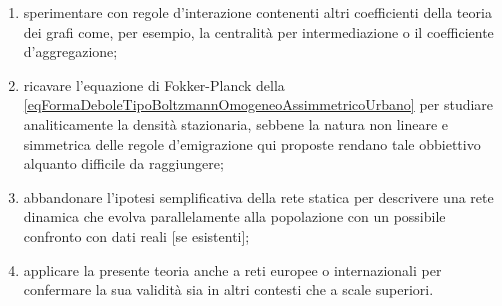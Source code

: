  \begin{enumerate}[
    label=\arabic*.,
  ]
    \item sperimentare con regole d'interazione contenenti altri coefficienti della teoria dei grafi come, per esempio, la centralità per intermediazione o il coefficiente d'aggregazione;
    \item ricavare l'equazione di Fokker-Planck della \ref{eqFormaDeboleTipoBoltzmannOmogeneoAssimmetricoUrbano} per studiare analiticamente la densità stazionaria, sebbene la natura non lineare e simmetrica delle regole d'emigrazione qui proposte rendano tale obbiettivo alquanto difficile da raggiungere;
    \item abbandonare l'ipotesi semplificativa della rete statica per descrivere una rete dinamica che evolva parallelamente alla popolazione con un possibile confronto con dati reali [se esistenti];
    \item applicare la presente teoria anche a reti europee o internazionali per confermare la sua validità sia in altri contesti che a scale superiori.
  \end{enumerate}
  